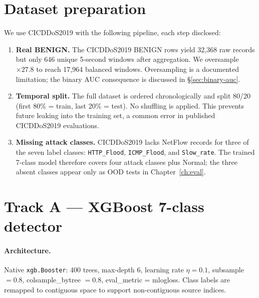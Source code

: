 \section{Dataset preparation}
\label{sec:dataset-limits}

We use CICDDoS2019 with the following pipeline, each step disclosed:

\begin{enumerate}
  \item \textbf{Real BENIGN.} The CICDDoS2019 BENIGN rows yield 32{,}368
        raw records but only 646 unique 5-second windows after aggregation.
        We oversample $\times 27.8$ to reach 17{,}964 balanced windows.
        Oversampling is a documented limitation; the binary AUC
        consequence is discussed in \S\ref{sec:binary-auc}.

  \item \textbf{Temporal split.} The full dataset is ordered chronologically
        and split 80/20 (first 80\% = train, last 20\% = test). No
        shuffling is applied. This prevents future leaking into the
        training set, a common error in published CICDDoS2019
        evaluations.

  \item \textbf{Missing attack classes.} CICDDoS2019 lacks NetFlow records
        for three of the seven label classes:
        \texttt{HTTP\_Flood}, \texttt{ICMP\_Flood}, and
        \texttt{Slow\_rate}. The trained 7-class model therefore covers
        four attack classes plus Normal; the three absent classes appear
        only as OOD tests in Chapter~\ref{ch:eval}.
\end{enumerate}

\section{Track A --- XGBoost 7-class detector}
\label{sec:xgb}

\paragraph{Architecture.}
Native \texttt{xgb.Booster}: 400 trees, max-depth 6, learning rate
$\eta = 0.1$, subsample $= 0.8$, colsample\_bytree $= 0.8$,
eval\_metric = mlogloss. Class labels are remapped to contiguous space
to support non-contiguous source indices.

